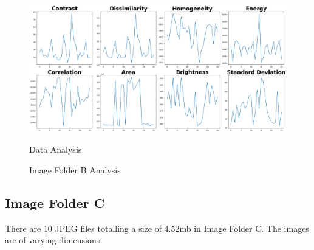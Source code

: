 \begin{figure}[ht]
\begin{minipage}[t]{0.50\textwidth}
        \centering
        \includegraphics[width=\textwidth]{Figures/EDA_Charts/3/da.png}
        \caption*{Data Analysis}
    \end{minipage}
    \caption{Image Folder B Analysis}
    \label{fig:Image Folder B Analysis}
\end{figure}

\newpage

\subsection{Image Folder C}

There are 10 JPEG files totalling a size of 4.52mb in Image Folder C. The images are of varying dimensions.

